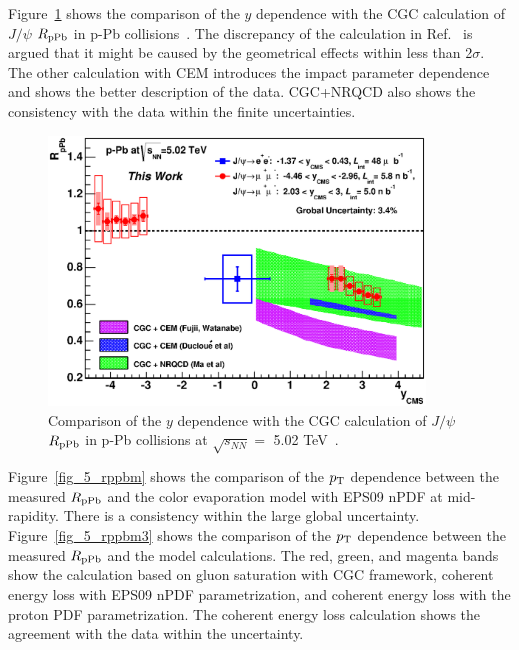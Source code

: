Figure~\ref{fig_5_rppbyvscgc} shows the comparison of the $y$ dependence with the CGC calculation of $J/\psi$ $R_{\rm{pPb}}$ in p-Pb collisions~\cite{bib_jpsisaturation,bib_cgc,bib_cgc2}.
The discrepancy of the calculation in Ref.~\cite{bib_jpsisaturation} is argued that it might be caused by the geometrical effects within less than 2$\sigma$.
 The other calculation with CEM introduces the impact parameter dependence and shows the better description of the data. 
 CGC+NRQCD also shows the consistency with the data within the finite uncertainties.  
\begin{figure}[!h]
  \centering
  \includegraphics[width=10cm]{chap5/figure/ModelComp/JpsiRpPb_cgc_y.eps}
  \caption{Comparison of the $y$ dependence with the CGC calculation of $J/\psi$ $R_{\rm{pPb}}$ in p-Pb collisions at $\sqrt{s_{NN}}=$ 5.02 TeV~\cite{bib_jpsisaturation,bib_cgc,bib_cgc2}.}
  \label{fig_5_rppbyvscgc}
\end{figure}

Figure~\ref{fig_5_rppbm} shows the comparison of the $p_{\rm{T}}$ dependence between the measured $R_{\rm{pPb}}$ and the color evaporation model with EPS09 nPDF at mid-rapidity. 
There is a consistency within the large global uncertainty. 
Figure~\ref{fig_5_rppbm3} shows the comparison of the $p_{\rm{T}}$ dependence between the measured $R_{\rm{pPb}}$ and the model calculations. 
The red, green, and magenta bands show the calculation based on gluon saturation with CGC framework, coherent energy loss with EPS09 nPDF parametrization, and coherent energy loss with the proton PDF parametrization.
The coherent energy loss calculation shows the agreement with the data within the uncertainty. 

